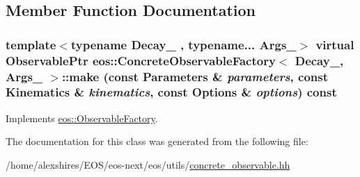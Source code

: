 \subsection{Member Function Documentation}
\hypertarget{classeos_1_1ConcreteObservableFactory_ace91bf102a1303e6efedaee0e8b2f8e6}{
\subsubsection[{make}]{\setlength{\rightskip}{0pt plus 5cm}template$<$typename Decay\_\- , typename... Args\_\-$>$ virtual {\bf ObservablePtr} {\bf eos::ConcreteObservableFactory}$<$ Decay\_\-, Args\_\- $>$::make (const {\bf Parameters} \& {\em parameters}, \/  const {\bf Kinematics} \& {\em kinematics}, \/  const {\bf Options} \& {\em options}) const}}
\label{classeos_1_1ConcreteObservableFactory_ace91bf102a1303e6efedaee0e8b2f8e6}


Implements \hyperlink{classeos_1_1ObservableFactory_ac338d98049d8db85548aab9d3c74bcda}{eos::ObservableFactory}.

The documentation for this class was generated from the following file:\begin{DoxyCompactItemize}
\item 
/home/alexshires/EOS/eos-\/next/eos/utils/\hyperlink{concrete__observable_8hh}{concrete\_\-observable.hh}\end{DoxyCompactItemize}
